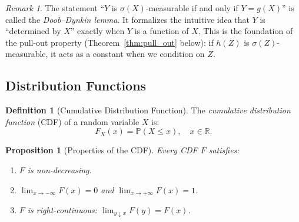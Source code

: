 \documentclass[11pt,a4paper]{article}
\theoremstyle{definition}
\newtheorem{definition}{Definition}[section]
\theoremstyle{plain}
\newtheorem{proposition}[theorem]{Proposition}
\theoremstyle{remark}
\newtheorem{remark}{Remark}[section]
\newcommand{\R}{\mathbb{R}}
\newcommand{\Prob}{\mathbb{P}}
\begin{document}
\begin{remark}
The statement ``$Y$ is $\sigma(X)$-measurable if and only if $Y = g(X)$'' is called the \emph{Doob--Dynkin lemma}. It formalizes the intuitive idea that $Y$ is ``determined by $X$'' exactly when $Y$ is a function of $X$. This is the foundation of the pull-out property (Theorem~\ref{thm:pull_out} below): if $h(Z)$ is $\sigma(Z)$-measurable, it acts as a constant when we condition on $Z$.
\end{remark}

\subsection{Distribution Functions}
\label{subsec:distributions}

\begin{definition}[Cumulative Distribution Function]
\label{def:cdf}
The \emph{cumulative distribution function} (CDF) of a random variable $X$ is:
\begin{equation}
    F_X(x) = \Prob(X \leq x), \quad x \in \R.
    \label{eq:cdf}
\end{equation}
\end{definition}

\begin{proposition}[Properties of the CDF]
\label{prop:cdf_props}
Every CDF $F$ satisfies:
\begin{enumerate}[nosep]
    \item $F$ is non-decreasing.
    \item $\lim_{x \to -\infty} F(x) = 0$ and $\lim_{x \to +\infty} F(x) = 1$.
    \item $F$ is right-continuous: $\lim_{y \downarrow x} F(y) = F(x)$.
\end{enumerate}
\end{proposition}
\end{document}
